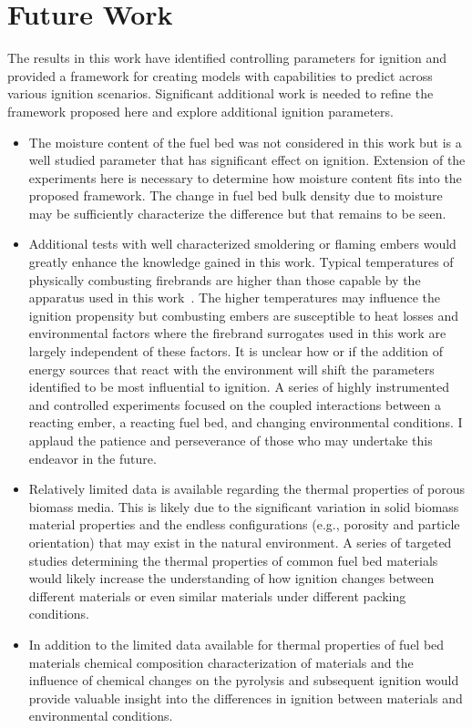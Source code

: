 \section{Future Work}
    The results in this work have identified controlling parameters for ignition and provided a framework for creating models with capabilities to predict across various ignition scenarios.  Significant additional work is needed to refine the framework proposed here and explore additional ignition parameters. 
        \begin{itemize}
            \item The moisture content of the fuel bed was not considered in this work but is a well studied parameter that has significant effect on ignition. Extension of the experiments here is necessary to determine how moisture content fits into the proposed framework. The change in fuel bed bulk density due to moisture may be sufficiently characterize the difference but that remains to be seen.
            
            \item Additional tests with well characterized smoldering or flaming embers would greatly enhance the knowledge gained in this work. Typical temperatures of physically combusting firebrands are higher than those capable by the apparatus used in this work~\cite{Fateev2017a}. The higher temperatures may influence the ignition propensity but combusting embers are susceptible to heat losses and environmental factors where the firebrand surrogates used in this work are largely independent of these factors. It is unclear how or if the addition of energy sources that react with the environment will shift the parameters identified to be most influential to ignition. A series of highly instrumented and controlled experiments focused on the coupled interactions between a reacting ember, a reacting fuel bed, and changing environmental conditions. I applaud the patience and perseverance of those who may undertake this endeavor in the future. 
            
            \item Relatively limited data is available regarding the thermal properties of porous biomass media. This is likely due to the significant variation in solid biomass material properties and the endless configurations (e.g., porosity and particle orientation) that may exist in the natural environment. A series of targeted studies determining the thermal properties of common fuel bed materials would likely increase the understanding of how ignition changes between different materials or even similar materials under different packing conditions.
            
            \item In addition to the limited data available for thermal properties of fuel bed materials chemical composition characterization of materials and the influence of chemical changes on the pyrolysis and subsequent ignition would provide valuable insight into the differences in ignition between materials and environmental conditions. 
        \end{itemize}